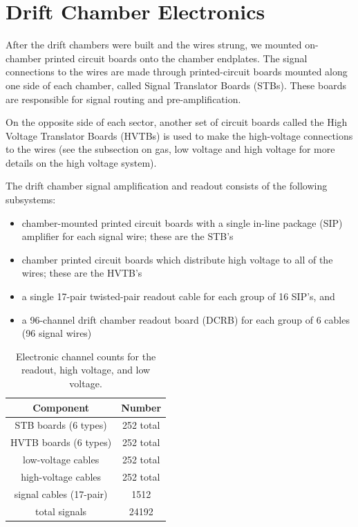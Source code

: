 \section{Drift Chamber Electronics}

After the drift chambers were built and the wires strung, we mounted
on-chamber printed circuit boards onto the chamber endplates.
The signal connections to the wires are made through printed-circuit 
boards mounted along one side of each chamber, called Signal Translator 
Boards (STBs).  These boards are responsible for signal routing and 
pre-amplification.  

On the opposite side of each sector, another set of 
circuit boards called the High Voltage Translator Boards (HVTBs) is used 
to make the high-voltage connections to the wires (see the subsection
on gas, low voltage and high voltage for more details on the high
voltage system).

The drift chamber signal amplification and readout consists of the 
following subsystems:
\begin{itemize}
\item  chamber-mounted printed circuit boards with a single in-line package
(SIP) amplifier for each signal wire; these are the STB's
\item  chamber printed circuit boards which distribute high voltage
to all of the wires; these are the HVTB's
\item a single 17-pair twisted-pair readout cable for each group of 16
SIP's, and
\item a 96-channel drift chamber readout board (DCRB) for each group
of 6 cables (96 signal wires)
\end{itemize}


\begin{table}[htbp]
\begin{center}
\begin{tabular} {||c|c||} \hline \hline
{\bf Component}           & {\bf Number} \\ \hline
STB boards (6 types)      & 252 total \\ \hline
HVTB boards (6 types)     & 252 total \\ \hline
low-voltage cables        & 252 total  \\ \hline
high-voltage cables       & 252 total  \\ \hline
signal cables (17-pair)   & 1512 \\ \hline
total signals             & 24192 \\ \hline \hline
\end{tabular}
\caption{\small{Electronic channel counts for the readout, high voltage,
and low voltage.}}
\label{electronic-channels}
\end{center}
\end{table}

